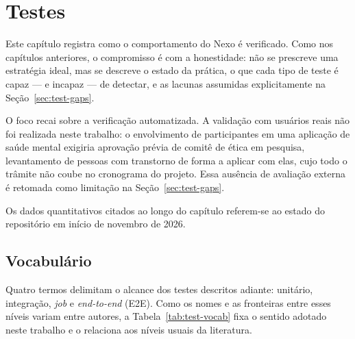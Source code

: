 \chapter{Testes}\label{cap:testes}

Este capítulo registra como o comportamento do Nexo é verificado. Como nos
capítulos anteriores, o compromisso é com a honestidade: não se prescreve uma
estratégia ideal, mas se descreve o estado da prática, o que cada tipo de teste
é capaz --- e incapaz --- de detectar, e as lacunas assumidas explicitamente na
Seção~\ref{sec:test-gaps}.

O foco recai sobre a verificação automatizada. A validação com usuários reais
não foi realizada neste trabalho: o envolvimento de participantes em uma
aplicação de saúde mental exigiria aprovação prévia de comitê de ética em
pesquisa, levantamento de pessoas com transtorno de forma a aplicar com elas,
cujo todo o trâmite não coube no cronograma do projeto. Essa ausência de
avaliação externa é retomada como limitação na Seção~\ref{sec:test-gaps}.

Os dados quantitativos citados ao longo do capítulo referem-se ao estado do
repositório em início de novembro de 2026.

\section{Vocabulário}\label{sec:test-vocab}

Quatro termos delimitam o alcance dos testes descritos adiante: unitário,
integração, \textit{job} e \textit{end-to-end} (E2E). Como os nomes e as
fronteiras entre esses níveis variam entre autores, a Tabela~\ref{tab:test-vocab}
fixa o sentido adotado neste trabalho e o relaciona aos níveis usuais da
literatura.

